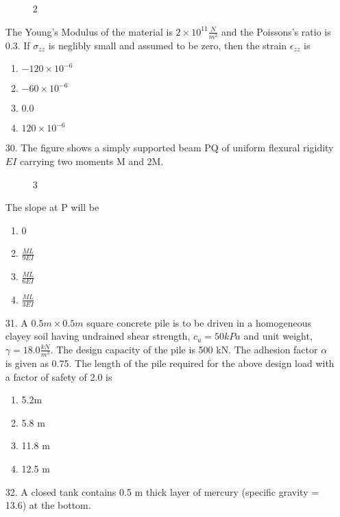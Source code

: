 \documentclass[journal]{IEEEtran}
\begin{document}
\begin{enumerate}
    \begin{figure}[!ht]
        \centering
        \caption{2}
    \end{figure}
    The Young's Modulus of the material is $2\times 10^{11}\frac{N}{m^2}$ and the Poissons's ratio is 0.3. If $\sigma_{zz}$ is neglibly small and assumed to be zero, then the strain $\epsilon_{zz}$ is 
    \begin{enumerate}[label=(\Alph*)]
        \item $-120\times 10^{-6}$
        \item $-60\times 10^{-6}$
        \item $0.0$
        \item $120\times 10^{-6}$
    \end{enumerate}
    \item[30.] The figure shows a simply supported beam PQ of uniform flexural rigidity $EI$ carrying two
    moments M and 2M. 
    \begin{figure}[!ht]
        \centering
        \caption{3}
    \end{figure}
    The slope at P will be
    \begin{enumerate}[label= (\Alph*)]
        \item 0
        \item $\frac{ML}{9EI}$
        \item $\frac{ML}{6EI}$
        \item $\frac{ML}{3EI}$
    \end{enumerate}
    \item[31.] A $0.5 m \times 0.5 m$ square concrete pile is to be driven in a homogeneous clayey soil having
    undrained shear strength, $c_u = 50 kPa$ and unit weight, $\gamma = 18.0 \frac{kN}{m^3}$. The design capacity
    of the pile is 500 kN. The adhesion factor $\alpha$ is given as 0.75. The length of the pile required
    for the above design load with a factor of safety of 2.0 is 
    \begin{enumerate}[label = (\Alph*)]
        \item 5.2m 
        \item 5.8 m 
        \item 11.8 m
        \item 12.5 m 
    \end{enumerate}
    \item[32.] A closed tank contains 0.5 m thick layer of mercury (specific gravity = 13.6) at the bottom.

\end{enumerate}
\end{document}
